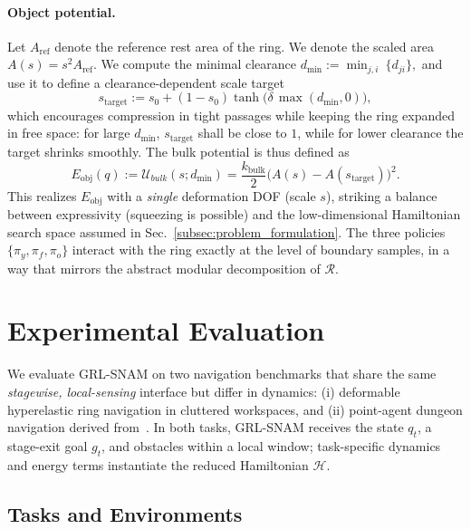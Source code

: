 \documentclass{article} %
\begin{document}
\paragraph{Object potential.}

Let $A_{\text{ref}}$ denote the reference rest area of the ring. We denote the scaled area $A(s)= s^2 A_{\text{ref}}$.
We compute the minimal clearance \(d_{\min}:=\min_{j,i}~\{d_{ji}\},\)
and use it to define a clearance-dependent scale target 
\begin{equation}
s_{\text{target}}
:=
s_0 + (1-s_0)\tanh\big(\delta\,\max(d_{\min},0)\big),
\label{eq:def:radius:target}
\end{equation}
which encourages compression in tight passages while keeping the ring expanded in free space:
for large $d_{\min}$, $s_{\text{target}}$ shall be close to $1$, while for lower clearance the target shrinks smoothly.
The bulk potential is thus defined as
\begin{equation}
{E}_{\text{obj}}(q):=\mathcal{U}_{bulk}(s;d_{\min})
=
\frac{k_{\text{bulk}}}{2}\big(A(s) - A(s_{\text{target}})\big)^2.
\end{equation}
This realizes $E_{\mathrm{obj}}$ with a \emph{single} deformation DOF (scale $s$), striking a balance between expressivity (squeezing is possible) and the low-dimensional Hamiltonian search space assumed in Sec.~\ref{subsec:problem_formulation}. The three policies $\{\pi_y,\pi_f,\pi_o\}$ interact with the ring exactly at the level of boundary samples, in a way that mirrors the abstract modular decomposition of $\mathcal{R}$.




\section{Experimental Evaluation}
\label{sec:experiments}

We evaluate GRL-SNAM on two navigation benchmarks that share the same \emph{stagewise, local-sensing} interface but differ in dynamics: (i) deformable hyperelastic ring navigation in cluttered workspaces, and (ii) point-agent dungeon navigation derived from~\citet{liang2023context}. In both tasks, GRL-SNAM receives the state $q_t$, a stage-exit goal $g_t$, and obstacles within a local window; task-specific dynamics and energy terms instantiate the reduced Hamiltonian $\mathcal{H}$.

\subsection{Tasks and Environments}
\label{subsec:tasks}
\end{document}
